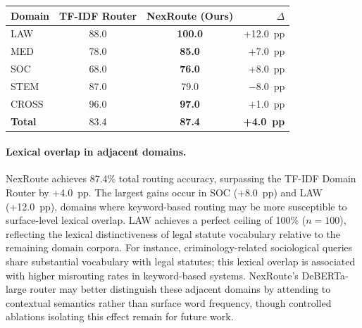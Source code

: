 \documentclass[a4paper,fleql]{cas-sc}
\begin{document}
\vspace{6pt plus 4pt minus 3pt}
\begin{center}
\begingroup
{}
\label{tab:router_acc}
\begin{tabular}{lccr}
\toprule
\textbf{Domain} & \textbf{TF-IDF Router} & \textbf{NexRoute (Ours)} & \textbf{$\Delta$} \\
\midrule
LAW              & 88.0 & \textbf{100.0} & +12.0~pp \\
MED              & 78.0 & \textbf{85.0}  & +7.0~pp \\
SOC              & 68.0 & \textbf{76.0}  & +8.0~pp \\
STEM             & 87.0 & 79.0           & $-$8.0~pp \\
\midrule
CROSS            & 96.0 & \textbf{97.0}  & +1.0~pp \\
\midrule
\textbf{Total}   & 83.4 & \textbf{87.4}  & \textbf{+4.0~pp} \\
\bottomrule
\end{tabular}
\endgroup
\end{center}
\vspace{6pt plus 4pt minus 3pt}

\paragraph{Lexical overlap in adjacent domains.}
NexRoute achieves 87.4\% total routing accuracy, surpassing the
TF-IDF Domain Router by +4.0~pp. The largest gains occur in SOC (+8.0~pp) and LAW
(+12.0~pp), domains where keyword-based routing may be more susceptible to
surface-level lexical overlap. LAW achieves a perfect ceiling of 100\% ($n{=}100$),
reflecting the lexical distinctiveness of legal statute vocabulary relative to the
remaining domain corpora. For instance, criminology-related sociological
queries share substantial vocabulary with legal statutes; this lexical
overlap is associated with higher misrouting rates in keyword-based systems.
NexRoute's DeBERTa-large router may better distinguish these adjacent domains
by attending to contextual semantics rather than surface word frequency,
though controlled ablations isolating this effect remain for future work.
\end{document}
